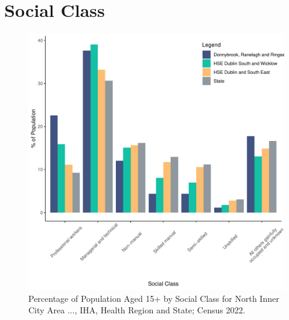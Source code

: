 \documentclass{article}
\begin{document}
\section{Social Class}\label{sect:SC}
\begin{figure}[H]
	\centering
	\includegraphics[width = 140mm]{../figures/SocialClassED.pdf}
	\caption{Percentage of Population Aged 15+ by Social Class for North Inner City Area ..., IHA, Health Region and State; Census 2022.}
	\label{fig:vbnv}
	\end{figure}
\end{document}
